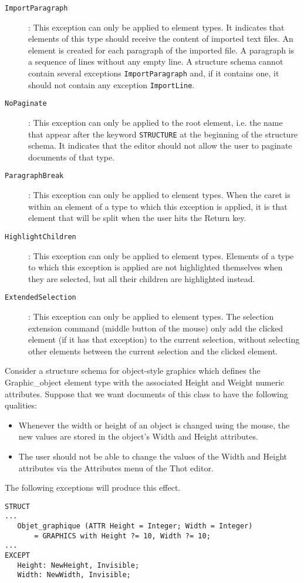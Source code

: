\begin{description}
\item[{\tt ImportParagraph}]: This exception can only be applied to element
types.  It indicates that elements of this type should receive the
content of imported text files.  An element is created for each paragraph
of the imported file.  A paragraph is a sequence of lines without any
empty line.  A structure schema cannot contain several exceptions
{\tt ImportParagraph} and, if it contains one, it should not contain any
exception {\tt ImportLine}.

\item[{\tt NoPaginate}]: This exception can only be applied to the root
element, i.e. the name that appear after the keyword {\tt STRUCTURE} at the
beginning of the structure schema.  It indicates that the editor should not
allow the user to paginate documents of that type.

\item[{\tt ParagraphBreak}]: This exception can only be applied to element
types.  When the caret is within an element of a type to which this exception
is applied, it is that element that will be split when the user hits the
Return key.

\item[{\tt HighlightChildren}]: This exception can only be applied to element
types.  Elements of a type to which this exception is applied are not
highlighted themselves when they are selected, but all their children are
highlighted instead.

\item[{\tt ExtendedSelection}]: This exception can only be applied to element
types.  The selection extension command (middle button of the mouse) only add
the clicked element (if it has that exception) to the current selection,
without selecting other elements between the current selection and the
clicked element.

\end{description}

\begin{example}
Consider a structure schema for object-style graphics which defines
the Graphic\_object element type with the associated Height and Weight numeric
attributes.  Suppose that we want documents of this class to have the
following qualities:
\begin{itemize}

\item Whenever the width or height of an object is changed using the
mouse, the new values are stored in the object's Width and
Height attributes.

\item The user should not be able to change the values of the
Width and Height attributes via the Attributes menu of
the Thot editor.
\end{itemize}
The following exceptions will produce this effect.
\begin{verbatim}
STRUCT
...
   Objet_graphique (ATTR Height = Integer; Width = Integer)
       = GRAPHICS with Height ?= 10, Width ?= 10;
...
EXCEPT
   Height: NewHeight, Invisible;
   Width: NewWidth, Invisible;
\end{verbatim}
\end{example}

